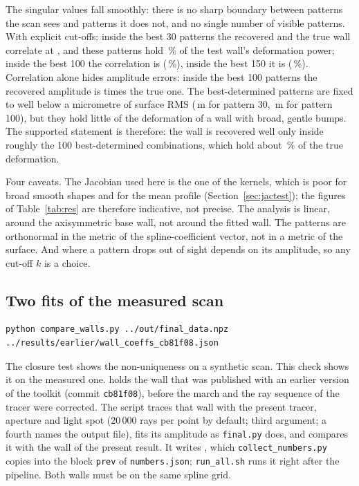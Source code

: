 \documentclass[11pt,a4paper]{article}
\newcommand{\um}{\,\textmu m}
\newcommand{\code}[1]{\texttt{#1}}
\begin{document}
The singular values fall smoothly: there is no sharp boundary between patterns the scan sees and
patterns it does not, and no single number of visible patterns. With explicit cut-offs: inside the
best 30 patterns the recovered and the true wall correlate at \ResCThirty, and these patterns hold
\ResFThirty\,\% of the test wall's deformation power; inside the best 100 the correlation is
\ResCHundred{} (\ResFHundred\,\%), inside the best 150 it is \ResCOneFifty{} (\ResFOneFifty\,\%).
Correlation alone hides amplitude errors: inside the best 100 patterns the recovered amplitude is
\ResAHundred{} times the true one. The best-determined patterns are fixed to well below a
micrometre of surface RMS (\ResSThirty\um{} for pattern 30, \ResSHundred\um{} for pattern 100), but
they hold little of the deformation of a wall with broad, gentle bumps. The supported statement is
therefore: the wall is recovered well only inside roughly the 100 best-determined combinations, which
hold about \ResFHundred\,\% of the true deformation.

Four caveats. The Jacobian used here is the one of the kernels, which is poor for broad smooth shapes
and for the mean profile (Section~\ref{sec:jactest}); the figures of Table~\ref{tab:res} are therefore
indicative, not precise. The analysis is linear, around the axisymmetric base wall, not around the
fitted wall. The patterns are orthonormal in the metric of the spline-coefficient vector, not in a metric of
the surface. And where a pattern drops out of sight depends on its amplitude, so any cut-off $k$ is a
choice.

\subsection{Two fits of the measured scan}
\label{sec:prev}

\begin{lstlisting}
python compare_walls.py ../out/final_data.npz ../results/earlier/wall_coeffs_cb81f08.json
\end{lstlisting}
The closure test shows the non-uniqueness on a synthetic scan. This check shows it on the measured
one.  holds the wall that was published with an
earlier version of the toolkit (commit \code{cb81f08}), before the march and the ray sequence of the
tracer were corrected. The script traces that wall with the present tracer, aperture and light spot
(20\,000 rays per point by default; third argument; a fourth names the output file), fits its amplitude as \code{final.py} does, and
compares it with the wall of the present result. It writes , which
\code{collect\_numbers.py} copies into the block \code{prev} of \code{numbers.json}; \code{run\_all.sh}
runs it right after the pipeline. Both walls must be on the same spline grid.
\end{document}
